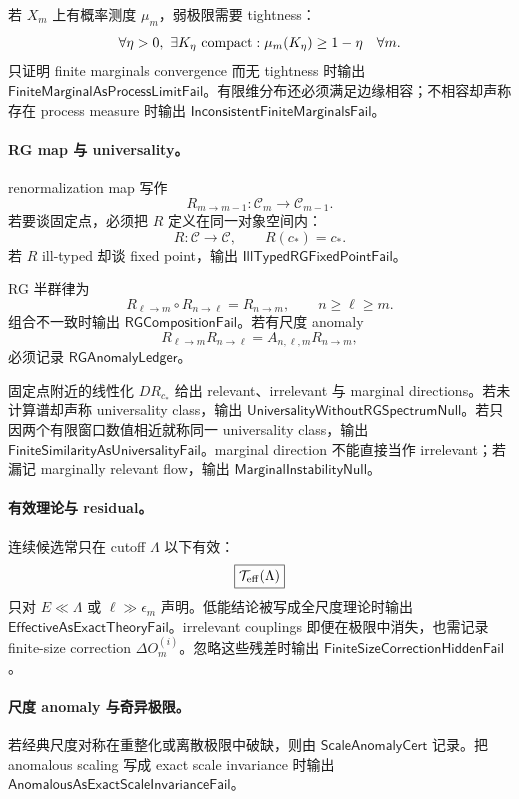 若 \(X_m\) 上有概率测度 \(\mu_m\)，弱极限需要 tightness：
\[
\forall\eta>0,\ \exists K_\eta\ {\rm compact}:
\mu_m(K_\eta)\ge1-\eta\quad\forall m.
\]
只证明 finite marginals convergence 而无 tightness 时输出 \(\mathsf{FiniteMarginalAsProcessLimitFail}\)。有限维分布还必须满足边缘相容；不相容却声称存在 process measure 时输出 \(\mathsf{InconsistentFiniteMarginalsFail}\)。

\paragraph{RG map 与 universality。}
renormalization map 写作
\[
\boxed{
R_{m\to m-1}:\mathcal C_m\to\mathcal C_{m-1}.
}
\]
若要谈固定点，必须把 \(R\) 定义在同一对象空间内：
\[
R:\mathcal C\to\mathcal C,
\qquad
R(c_*)=c_*.
\]
若 \(R\) ill-typed 却谈 fixed point，输出 \(\mathsf{IllTypedRGFixedPointFail}\)。

RG 半群律为
\[
\boxed{
R_{\ell\to m}\circ R_{n\to\ell}=R_{n\to m},
\qquad n\ge\ell\ge m.
}
\]
组合不一致时输出 \(\mathsf{RGCompositionFail}\)。若有尺度 anomaly
\[
R_{\ell\to m}R_{n\to\ell}=A_{n,\ell,m}R_{n\to m},
\]
必须记录 \(\mathsf{RGAnomalyLedger}\)。

固定点附近的线性化 \(DR_{c_*}\) 给出 relevant、irrelevant 与 marginal directions。若未计算谱却声称 universality class，输出 \(\mathsf{UniversalityWithoutRGSpectrumNull}\)。若只因两个有限窗口数值相近就称同一 universality class，输出 \(\mathsf{FiniteSimilarityAsUniversalityFail}\)。marginal direction 不能直接当作 irrelevant；若漏记 marginally relevant flow，输出 \(\mathsf{MarginalInstabilityNull}\)。

\paragraph{有效理论与 residual。}
连续候选常只在 cutoff \(\Lambda\) 以下有效：
\[
\boxed{
\mathcal T_{\rm eff}(\Lambda)
}
\]
只对 \(E\ll\Lambda\) 或 \(\ell\gg\epsilon_m\) 声明。低能结论被写成全尺度理论时输出 \(\mathsf{EffectiveAsExactTheoryFail}\)。irrelevant couplings 即便在极限中消失，也需记录 finite-size correction \(\Delta O_m^{(i)}\)。忽略这些残差时输出 \(\mathsf{FiniteSizeCorrectionHiddenFail}\)。

\paragraph{尺度 anomaly 与奇异极限。}
若经典尺度对称在重整化或离散极限中破缺，则由 \(\mathsf{ScaleAnomalyCert}\) 记录。把 anomalous scaling 写成 exact scale invariance 时输出 \(\mathsf{AnomalousAsExactScaleInvarianceFail}\)。

